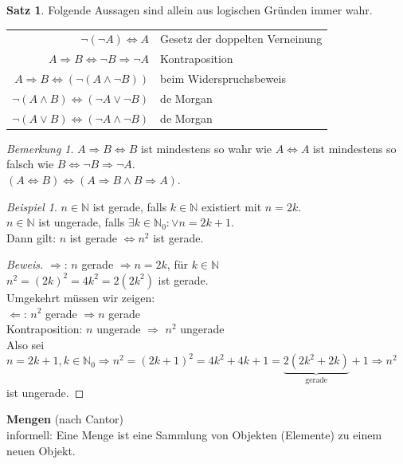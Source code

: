 \documentclass[12pt,a4paper,titlepage]{article} %
\theoremstyle{definition}
\newtheorem{satz}{Satz}[subsection]
\theoremstyle{remark}
\newtheorem*{bem}{Bemerkung}
\newtheorem*{bsp}{Beispiel}
\newenvironment{bew}{\begin{proof}[Beweis]}{\end{proof}}
\begin{document}
\begin{satz}
	Folgende Aussagen sind allein aus logischen Gründen immer wahr.
	\begin{tabular}{rl}
		\(\neg(\neg A) \Leftrightarrow A\) & Gesetz der doppelten Verneinung\\
		\(A \Rightarrow B \Leftrightarrow \neg B \Rightarrow \neg A\) & Kontraposition\\
		\(A \Rightarrow B \Leftrightarrow (\neg (A \wedge \neg B))\) & beim Widerspruchsbeweis\\
		\(\neg(A \wedge B) \Leftrightarrow (\neg A \vee \neg B)\) & de Morgan\\
		\(\neg(A \vee B) \Leftrightarrow (\neg A \wedge \neg B)\) & de Morgan\\
	\end{tabular}
\end{satz}
\begin{bem}
	\(A\Rightarrow B\Leftrightarrow B\) ist mindestens so wahr wie \(A \Leftrightarrow A\) ist mindestens so falsch wie \(B \Leftrightarrow \neg B \Rightarrow \neg A\).\\
	\((A\Leftrightarrow B) \Leftrightarrow (A \Rightarrow B \wedge B \Rightarrow A)\).
\end{bem}
\begin{bsp}
	\(n \in \mathbb{N}\) ist gerade, falls \(k \in \mathbb{N}\) existiert mit \(n = 2k\).\\
	\(n\in \mathbb{N}\) ist ungerade, falls \(\exists k\in \mathbb{N}_0: \vee n = 2k+1\).\\
	Dann gilt: $n$ ist gerade $\Leftrightarrow n^2$ ist gerade.
	\begin{bew}
		\glqq $\Rightarrow$\grqq : $n$ gerade $\Rightarrow n=2k$, für $k\in \mathbb{N}$\\
		$n^2 = (2k)^2 = 4k^2 = 2(2k^2)$ ist gerade.\\
		Umgekehrt müssen wir zeigen:\\
		\glqq $\Leftarrow$\grqq : $n^2$ gerade $\Rightarrow n$ gerade\\
		Kontraposition: $n$ ungerade $\Rightarrow$ $n^2$ ungerade\\
		Also sei $n = 2k+1, k \in \mathbb{N}_0 \Rightarrow n^2 = (2k+1)^2 = 4k^2 + 4k + 1 = \underbrace{2(2k^2 + 2k)}_{\text{gerade}} + 1 \Rightarrow n^2$ ist ungerade. 
	\end{bew}
\end{bsp} 
\textbf{Mengen} (nach Cantor)\\
informell: Eine Menge ist eine Sammlung von Objekten (Elemente) zu einem neuen Objekt.\\
\end{document}
